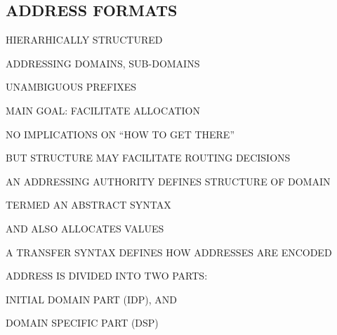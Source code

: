 \begin{bwslide}
\part*	{ADDRESS FORMATS}\bf

\begin{nrtc}
\item	HIERARHICALLY STRUCTURED
    \begin{nrtc}
    \item	ADDRESSING DOMAINS, SUB-DOMAINS

    \item	UNAMBIGUOUS PREFIXES
    \end{nrtc}

\item	MAIN GOAL: FACILITATE ALLOCATION

\item	NO IMPLICATIONS ON ``HOW TO GET THERE''
    \begin{nrtc}
    \item	BUT STRUCTURE MAY FACILITATE ROUTING DECISIONS
    \end{nrtc}
\end{nrtc}
\end{bwslide}


\begin{bwslide}

\begin{nrtc}
\item	AN ADDRESSING AUTHORITY DEFINES STRUCTURE OF DOMAIN
    \begin{nrtc}
    \item	TERMED AN ABSTRACT SYNTAX
    \end{nrtc}
    AND ALSO ALLOCATES VALUES

\item	A TRANSFER SYNTAX DEFINES HOW ADDRESSES ARE ENCODED
\end{nrtc}
\end{bwslide}


\begin{bwslide}

\begin{nrtc}
\item	ADDRESS IS DIVIDED INTO TWO PARTS:
    \begin{nrtc}
    \item	INITIAL DOMAIN PART (IDP), AND

    \item	DOMAIN SPECIFIC PART (DSP)
    \end{nrtc}
\end{nrtc}

\end{bwslide}


